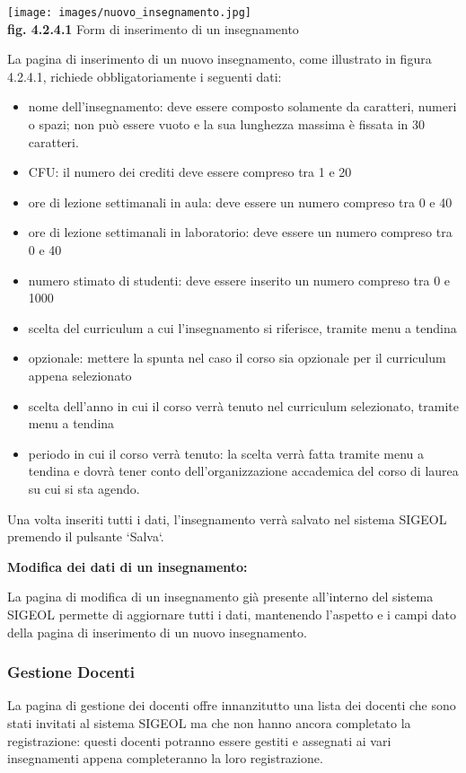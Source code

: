 \documentclass[11pt,a4paper]{article}
\begin{document}
\begin{center}
	\texttt{[image: images/nuovo\_insegnamento.jpg]}\\
	\textbf{fig. 4.2.4.1} Form di inserimento di un insegnamento\\
\end{center}

La pagina di inserimento di un nuovo insegnamento, come illustrato in figura 4.2.4.1, richiede obbligatoriamente i seguenti dati:
\begin{itemize}
 \item nome dell'insegnamento: deve essere composto solamente da caratteri, numeri o spazi; non può essere vuoto e la sua lunghezza massima è fissata in 30 caratteri.
 \item CFU: il numero dei crediti deve essere compreso tra 1 e 20
 \item ore di lezione settimanali in aula: deve essere un numero compreso tra 0 e 40
 \item ore di lezione settimanali in laboratorio: deve essere un numero compreso tra 0 e 40
 \item numero stimato di studenti: deve essere inserito un numero compreso tra 0 e 1000
 \item scelta del curriculum a cui l'insegnamento si riferisce, tramite menu a tendina
 \item opzionale: mettere la spunta nel caso il corso sia opzionale per il curriculum appena selezionato
 \item scelta dell'anno in cui il corso verrà tenuto nel curriculum selezionato, tramite menu a tendina
 \item periodo in cui il corso verrà tenuto: la scelta verrà fatta tramite menu a tendina e dovrà tener conto dell'organizzazione accademica del corso di laurea su cui si sta agendo.
\end{itemize}
Una volta inseriti tutti i dati, l'insegnamento verrà salvato nel sistema SIGEOL premendo il pulsante `Salva`.
\newline \newline
\begin{large}\textbf{Modifica dei dati di un insegnamento:}\end{large}
La pagina di modifica di un insegnamento già presente all'interno del sistema SIGEOL permette di aggiornare tutti i dati, mantenendo l'aspetto e i campi dato della pagina di inserimento di un nuovo insegnamento.
\subsubsection{Gestione Docenti}
La pagina di gestione dei docenti offre innanzitutto una lista dei docenti che sono stati invitati al sistema SIGEOL ma che non hanno ancora completato la registrazione: questi docenti potranno essere gestiti e assegnati ai vari insegnamenti appena completeranno la loro registrazione.
\end{document}
